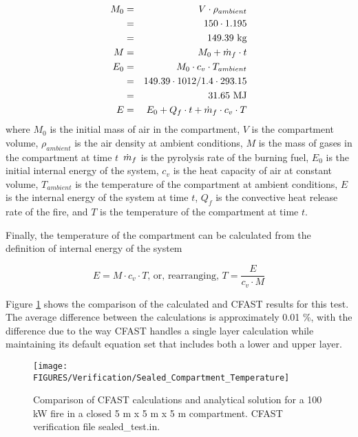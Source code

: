 \begin{eqnarray}
M_0 &=& V \cdot \rho_{ambient} \nonumber \\
 &=& 150 \cdot 1.195 \nonumber \\
 &=& 149.39 \text{\ kg} \nonumber \\
M &=& M_0 + \dot{m}_f \cdot t \\
E_0 &=& M_0 \cdot c_v \cdot T_{ambient} \nonumber \\
 &=& 149.39 \cdot 1012/1.4 \cdot 293.15 \nonumber \\
 &=& 31.65  \text{\ MJ} \nonumber \\
E &=& E_0 + Q_f \cdot t + \dot{m}_f \cdot c_v \cdot T
\end{eqnarray}
where $M_0$ is the initial mass of air in the compartment, $V$ is the compartment volume, $\rho_{ambient}$ is the air density at ambient conditions, $M$ is the mass of gases in the compartment at time $t$\, $\dot{m}_f$ is the pyrolysis rate of the burning fuel, $E_0$ is the initial internal energy of the system, $c_v$ is the heat capacity of air at constant volume, $T_{ambient}$ is the temperature of the compartment at ambient conditions, $E$ is the internal energy of the system at time $t$, $Q_f$ is the convective heat release rate of the fire, and $T$ is the temperature of the compartment at time $t$.

Finally, the temperature of the compartment can be calculated from the definition of internal energy of the system

\begin{equation}
E = M \cdot c_v \cdot T \text{, or, rearranging, } T = \frac{E}{c_v \cdot M}
\end{equation}

Figure \ref{fig:Analytical_Closed_Compartment} shows the comparison of the calculated and CFAST results for this test. The average difference between the calculations is approximately 0.01 \%, with the difference due to the way CFAST handles a single layer calculation while maintaining its default equation set that includes both a lower and upper layer.

\begin{figure}
\begin{center}
\texttt{[image: FIGURES/Verification/Sealed\_Compartment\_Temperature]}
\caption{Comparison of CFAST calculations and analytical solution for a 100 kW fire in a closed 5 m x 5 m x 5 m compartment.  CFAST verification file sealed\_test.in.}
\label{fig:Analytical_Closed_Compartment}
\end{center}
\end{figure}



